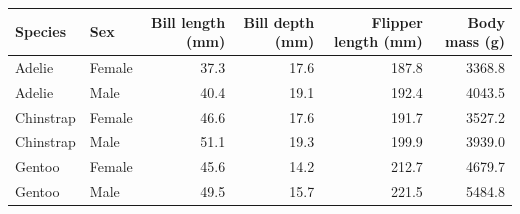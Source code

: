 \begin{tabular}{llrrrr}
\toprule
Species & Sex & Bill length (mm) & Bill depth (mm) & Flipper length (mm) & Body mass (g) \\
\midrule
Adelie & Female &   37.3 &   17.6 &  187.8 & 3368.8 \\
Adelie & Male &   40.4 &   19.1 &  192.4 & 4043.5 \\
Chinstrap & Female &   46.6 &   17.6 &  191.7 & 3527.2 \\
Chinstrap & Male &   51.1 &   19.3 &  199.9 & 3939.0 \\
Gentoo & Female &   45.6 &   14.2 &  212.7 & 4679.7 \\
Gentoo & Male &   49.5 &   15.7 &  221.5 & 5484.8 \\
\bottomrule
\end{tabular}
